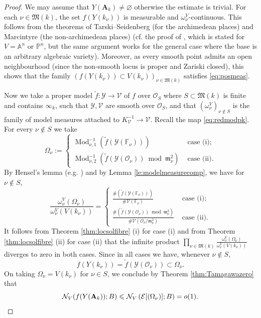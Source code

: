 \documentclass[11pt,letterpaper]{amsart}
\newcommand{\BA}{{\mathbb {A}}}
\newcommand{\BF}{{\mathbb {F}}}
\newcommand{\BP}{{\mathbb {P}}}
\newcommand{\CE}{{\mathcal {E}}}
\newcommand{\CN}{{\mathcal {N}}}
\newcommand{\CO}{{\mathcal {O}}}
\newcommand{\CV}{{\mathcal {V}}}
\newcommand{\CY}{{\mathcal {Y}}}
\newcommand{\RA}{{\mathbf {A}}}
\theoremstyle{plain}
\numberwithin{equation}{section}
\theoremstyle{definition}
\theoremstyle{remark}
\begin{document}
\begin{proof}
		We may assume that $Y(\RA_k)\neq\varnothing$ otherwise the estimate is trivial. For each $\nu\in\mathfrak{M}(k)$, the set $f(Y(k_\nu))$ is measurable and $\omega_\nu^V$-continuous. This follows from the theorems of Tarski--Seidenberg (for the archimedean places) and Marcintyre (the non-archimedean places) (cf. the proof of \cite[Lemma 3.9]{BBL}, which is stated for $V=\BA^n$ or $\BP^n$, but the same argument works for the general case where the base is an arbitrary algebraic variety). Moreover, as every smooth point admits an open neighbourhood (since the non-smooth locus is proper and Zariski closed), this shows that the family $(f(Y(k_\nu))\subset V(k_\nu))_{\nu\in\mathfrak{M}(k)}$ satisfies \eqref{eq:posmeas}. 
		
		Now we take a proper model $\widetilde{f}:\CY\to\CV$ of $f$ over $\CO_S$ where $S\subset \mathfrak{M}(k)$ is finite and contains $\infty_k$, such that $\CY,\CV$ are smooth over $\CO_S$, and that $(\omega_\nu^V)_{\nu\notin S}$ is the family of model measures attached to $K_{\CV}^{-1}\to\CV$.
		Recall the map \eqref{eq:redmodpk}. For every $\nu\notin S$ we take 
\begin{equation}\label{eq:case1}
			\Omega_\nu:=\begin{cases}
				\operatorname{Mod}_{\nu,1}^{-1}(\widetilde{f}(\CY(\BF_\nu))) & \text{ case (i)};\\ 	\operatorname{Mod}_{\nu,2}^{-1}\left(\widetilde{f}(\CY(\CO_\nu))\bmod \mathfrak{m}_\nu^2\right) & \text{ case (ii)}.
			\end{cases}
\end{equation}
		By Hensel's lemma (e.g. \cite[Lemma 2.1]{Browning-Loughran}) and  by  Lemma \ref{le:modelmeasurecomp}, we have for $\nu\notin S$,
		\begin{equation}\label{eq:case2}
			\frac{\omega_\nu^V(\Omega_{\nu})}{\omega_\nu^V(V(k_\nu))}=\begin{cases}
			\frac{\#\left(\widetilde{f}(\CY(\BF_\nu))\right)}{\#\CV(\BF_\nu)} & \text{ case (i)};\\
			\frac{\#\left(\widetilde{f}(\CY(\CO_\nu))\bmod \mathfrak{m}_\nu^2\right)}{ \#\CV(\CO_\nu/\mathfrak{m}_\nu^2)}& \text{ case (ii)}.
		\end{cases}
		\end{equation}
		It follows from Theorem \ref{thm:locsolfibre} (i) for case (i) and from Theorem \ref{thm:locsolfibre} (ii) for case (ii) that the infinite product $\prod_{\nu\in\mathfrak{M}(k)}\frac{\omega_\nu^V(\Omega_{\nu})}{\omega_\nu^V(V(k_\nu))}$ diverges to zero in both cases. 
		Since in all cases we have, whenever $\nu\notin S$,
		$$f(Y(k_\nu))=\widetilde{f}(\CY(\CO_{\nu}))\subset \Omega_{\nu}.$$ 
		On taking $\Omega_{\nu}=V(k_{\nu})$ for $\nu\in S$, we conclude by Theorem \ref{thm:Tamagawazero} that \begin{equation*}
			\CN_{V}(f(Y(\RA_k));B)\leqslant\CN_V\left(\CE[(\Omega_{\nu})];B\right)=o(1).\qedhere
		\end{equation*}
\end{proof}
\end{document}
